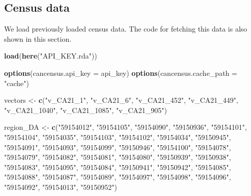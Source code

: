 \documentclass[
]{article}
\author{}
\date{\vspace{-2.5em}}
\newenvironment{Shaded}{\begin{snugshade}}{\end{snugshade}}
\newcommand{\AttributeTok}[1]{\textcolor[rgb]{0.13,0.29,0.53}{#1}}
\newcommand{\FunctionTok}[1]{\textcolor[rgb]{0.13,0.29,0.53}{\textbf{#1}}}
\newcommand{\NormalTok}[1]{#1}
\newcommand{\OtherTok}[1]{\textcolor[rgb]{0.56,0.35,0.01}{#1}}
\newcommand{\StringTok}[1]{\textcolor[rgb]{0.31,0.60,0.02}{#1}}
\begin{document}
\subsection{Census data}\label{census-data}

We load previously loaded census data. The code for fetching this data
is also shown in this section.

\begin{Shaded}
\begin{Highlighting}[]
\FunctionTok{load}\NormalTok{(}\FunctionTok{here}\NormalTok{(}\StringTok{"API\_KEY.rda"}\NormalTok{))}

\FunctionTok{options}\NormalTok{(}\AttributeTok{cancensus.api\_key =}\NormalTok{ api\_key)}
\FunctionTok{options}\NormalTok{(}\AttributeTok{cancensus.cache\_path =} \StringTok{"cache"}\NormalTok{)}

\NormalTok{vectors }\OtherTok{\textless{}{-}} \FunctionTok{c}\NormalTok{(}\StringTok{"v\_CA21\_1"}\NormalTok{, }\StringTok{"v\_CA21\_6"}\NormalTok{, }\StringTok{"v\_CA21\_452"}\NormalTok{, }\StringTok{"v\_CA21\_449"}\NormalTok{, }\StringTok{"v\_CA21\_1040"}\NormalTok{, }\StringTok{"v\_CA21\_1085"}\NormalTok{, }\StringTok{"v\_CA21\_905"}\NormalTok{)}

\NormalTok{region\_DA }\OtherTok{\textless{}{-}} \FunctionTok{c}\NormalTok{(}\StringTok{"59154012"}\NormalTok{, }\StringTok{"59154105"}\NormalTok{, }\StringTok{"59154090"}\NormalTok{, }\StringTok{"59150936"}\NormalTok{, }\StringTok{"59154101"}\NormalTok{, }\StringTok{"59154104"}\NormalTok{, }
               \StringTok{"59154035"}\NormalTok{, }\StringTok{"59154103"}\NormalTok{, }\StringTok{"59154102"}\NormalTok{, }\StringTok{"59154034"}\NormalTok{, }\StringTok{"59150945"}\NormalTok{, }\StringTok{"59154091"}\NormalTok{, }
               \StringTok{"59154093"}\NormalTok{, }\StringTok{"59154099"}\NormalTok{, }\StringTok{"59150946"}\NormalTok{, }\StringTok{"59154100"}\NormalTok{, }\StringTok{"59154078"}\NormalTok{, }\StringTok{"59154079"}\NormalTok{, }
               \StringTok{"59154082"}\NormalTok{, }\StringTok{"59154081"}\NormalTok{, }\StringTok{"59154080"}\NormalTok{, }\StringTok{"59150939"}\NormalTok{, }\StringTok{"59150938"}\NormalTok{, }\StringTok{"59154083"}\NormalTok{, }
               \StringTok{"59154095"}\NormalTok{, }\StringTok{"59154084"}\NormalTok{, }\StringTok{"59150941"}\NormalTok{, }\StringTok{"59150942"}\NormalTok{, }\StringTok{"59154085"}\NormalTok{, }\StringTok{"59154088"}\NormalTok{, }
               \StringTok{"59154087"}\NormalTok{, }\StringTok{"59154089"}\NormalTok{, }\StringTok{"59154097"}\NormalTok{, }\StringTok{"59154098"}\NormalTok{, }\StringTok{"59154096"}\NormalTok{, }\StringTok{"59154092"}\NormalTok{, }
               \StringTok{"59154013"}\NormalTok{, }\StringTok{"59150952"}\NormalTok{)}


\end{Highlighting}
\end{Shaded}
\end{document}
